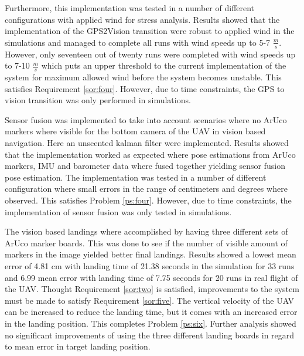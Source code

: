 \documentclass[../Head/report.tex]{subfiles}
\begin{document}
Furthermore, this implementation was tested in a number of different configurations with applied wind for stress analysis. Results showed that the implementation of the GPS2Vision transition were robust to applied wind in the simulations and managed to complete all runs with wind speeds up to 5-7 $\frac{m}{s}$. However, only seventeen out of twenty runs were completed with wind speeds up to 7-10 $\frac{m}{s}$ which puts an upper threshold to the current implementation of the system for maximum allowed wind before the system becomes unstable. This satisfies Requirement \ref{sor:four}. However, due to time constraints, the GPS to vision transition was only performed in simulations. 

Sensor fusion was implemented to take into account scenarios where no ArUco markers where visible for the bottom camera of the UAV in vision based navigation. Here an unscented kalman filter were implemented. Results showed that the implementation worked as expected where pose estimations from ArUco markers, IMU and barometer data where fused together yielding sensor fusion pose estimation. The implementation was tested in a number of different configuration where small errors in the range of centimeters and degrees where observed. This satisfies Problem \ref{ps:four}. However, due to time constraints, the implementation of sensor fusion was only tested in simulations.

The vision based landings where accomplished by having three different sets of ArUco marker boards. This was done to see if the number of visible amount of markers in the image yielded better final landings. Results showed a lowest mean error of 4.81 cm with landing time of 21.38 seconds in the simulation for 33 runs and 6.99 mean error with landing time of 7.75 seconds for 20 runs in real flight of the UAV. Thought Requirement \ref{sor:two} is satisfied, improvements to the system must be made to satisfy Requirement \ref{sor:five}. The vertical velocity of the UAV can be increased to reduce the landing time, but it comes with an increased error in the landing position. This completes Problem \ref{ps:six}. Further analysis showed no significant improvements of using the three different landing boards in regard to mean error in target landing position.
\end{document}
